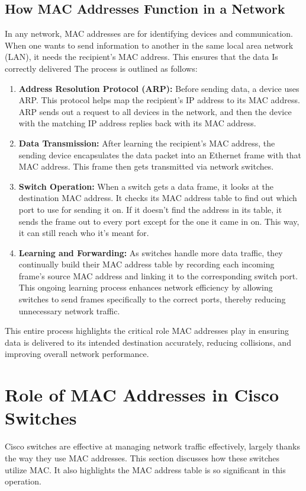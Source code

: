 \documentclass[11pt,a4paper]{article}
\begin{document}
\subsection*{How MAC Addresses Function in a Network}

In any network, MAC addresses are for identifying devices and communication. When one wants to send information to another in the same local area network (LAN), it needs the recipient's MAC address. This ensures that the data Is correctly delivered The process is outlined as follows:

\begin{enumerate}
    
    \item \textbf{Address Resolution Protocol (ARP):} Before sending data, a device uses ARP. This protocol helps map the recipient's IP address to its MAC address. ARP sends out a request to all devices in the network, and then the device with the matching IP address replies back with its MAC address.

    \item \textbf{Data Transmission:} After learning the recipient’s MAC address, the sending device encapsulates the data packet into an Ethernet frame with that MAC address. This frame then gets transmitted via network switches.

    \item \textbf{Switch Operation:} When a switch gets a data frame, it looks at the destination MAC address. It checks its MAC address table to find out which port to use for sending it on. If it doesn't find the address in its table, it sends the frame out to every port except for the one it came in on. This way, it can still reach who it's meant for.


    \item \textbf{Learning and Forwarding:} As switches handle more data traffic, they continually build their MAC address table by recording each incoming frame’s source MAC address and linking it to the corresponding switch port. This ongoing learning process enhances network efficiency by allowing switches to send frames specifically to the correct ports, thereby reducing unnecessary network traffic.

\end{enumerate}

This entire process highlights the critical role MAC addresses play in ensuring data is delivered to its intended destination accurately, reducing collisions, and improving overall network performance.


\section*{Role of MAC Addresses in Cisco Switches}

Cisco switches are effective at managing network traffic effectively, largely thanks the way they use MAC addresses. This section discusses how these switches utilize MAC. It also highlights the MAC address table is so significant in this operation.
\end{document}

